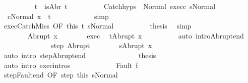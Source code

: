 \begin{isabellebody}
\ \ \ \ \ \ \ \ \isamarkupfalse%
\ t{\isacharcolon}\ {\isachardoublequoteopen}{\isasymnot}\ isAbr\ t{\isachardoublequoteclose}\isanewline
\ \ \ \ \ \ \ \ \isamarkupfalse%
\ Catch{\isachardot}hyps\ {\isacharparenleft}{}{\isacharparenright}\ Normal\ exec{\isacharunderscore}c\ s{\isacharunderscore}Normal\isanewline
\ \ \ \ \ \ \ \ \isamarkupfalse%
\ {\isachardoublequoteopen}{\isasymGamma}{\isasymturnstile}\ {\isasymlangle}cNormal\ x{\isasymrangle}\ {\isasymRightarrow}\ t{\isachardoublequoteclose}\isanewline
\ \ \ \ \ \ \ \ \ \ \isamarkupfalse%
\ simp\isanewline
\ \ \ \ \ \ \ \ \isamarkupfalse%
\ exec{\isachardot}CatchMiss\ {\isacharbrackleft}OF\ this\ t{\isacharbrackright}\ s{\isacharunderscore}Normal\isanewline
\ \ \ \ \ \ \ \ \isamarkupfalse%
\ {\isacharquery}thesis\ \isamarkupfalse%
\ simp\isanewline
\ \ \ \ \ \ \isamarkupfalse%
\isanewline
\ \ \ \ \isamarkupfalse%
\isanewline
\ \ \ \ \ \ \isamarkupfalse%
\ {\isacharparenleft}Abrupt\ x{\isacharprime}{\isacharparenright}\isanewline
\ \ \ \ \ \ \isamarkupfalse%
\ exec{\isacharprime}\ \isamarkupfalse%
\ {\isachardoublequoteopen}t{\isacharequal}Abrupt\ x{\isacharprime}{\isachardoublequoteclose}\isanewline
\ \ \ \ \ \ \ \ \isamarkupfalse%
\ {\isacharparenleft}auto\ intro{\isacharcolon}Abrupt{\isacharunderscore}end{\isacharparenright}\isanewline
\ \ \ \ \ \ \isamarkupfalse%
\isanewline
\ \ \ \ \ \ \isamarkupfalse%
\ step\ Abrupt\isanewline
\ \ \ \ \ \ \isamarkupfalse%
\ {\isachardoublequoteopen}s{\isacharequal}Abrupt\ x{\isacharprime}{\isachardoublequoteclose}\isanewline
\ \ \ \ \ \ \ \ \isamarkupfalse%
\ {\isacharparenleft}auto\ intro{\isacharcolon}\ step{\isacharunderscore}Abrupt{\isacharunderscore}end{\isacharparenright}\isanewline
\ \ \ \ \ \ \isamarkupfalse%
\isanewline
\ \ \ \ \ \ \isamarkupfalse%
\ {\isacharquery}thesis\isanewline
\ \ \ \ \ \ \ \ \isamarkupfalse%
\ {\isacharparenleft}auto\ intro{\isacharcolon}\ exec{\isachardot}intros{\isacharparenright}\isanewline
\ \ \ \ \isamarkupfalse%
\isanewline
\ \ \ \ \ \ \isamarkupfalse%
\ {\isacharparenleft}Fault\ f{\isacharparenright}\isanewline
\ \ \ \ \ \ \isamarkupfalse%
\ step{\isacharunderscore}Fault{\isacharunderscore}end\ {\isacharbrackleft}OF\ step\ this{\isacharbrackright}\ s{\isacharunderscore}Normal\isanewline

\end{isabellebody}
